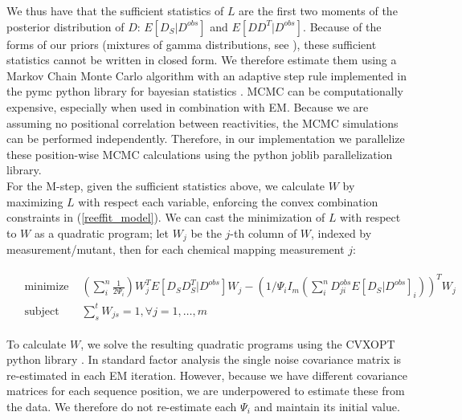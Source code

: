 \documentclass[12pt]{article}
\begin{document}
We thus have that the sufficient statistics of $L$ are the first two moments of the posterior distribution of $D$: $E[D_S | D^{obs}]$ and $E[DD^T | D^{obs}]$. Because of the forms of our priors (mixtures of gamma distributions, see \cite{Cordero2012a}), these sufficient statistics cannot be written in closed form. We therefore estimate them using a Markov Chain Monte Carlo algorithm with an adaptive step rule implemented in the pymc python library for bayesian statistics \cite{Patil2010}. MCMC can be computationally expensive, especially when used in combination with EM. Because we are assuming no positional correlation between reactivities, the MCMC simulations can be performed independently. Therefore, in our implementation we parallelize these position-wise MCMC calculations using the python joblib parallelization library.\\
For the M-step, given the sufficient statistics above, we calculate $W$ by maximizing $L$ with respect each variable, enforcing the convex combination constraints in (\ref{reeffit_model}). We can cast the minimization of $L$ with respect to $W$ as a quadratic program;	 let $W_j$ be the $j$-th column of $W$, indexed by measurement/mutant, then for each chemical mapping measurement $j$:


\begin{align}
  &\begin{aligned}\label{W_qp}
   \mbox{minimize } &(\sum_i^n \frac{1}{2\Psi_{i}})W_j^TE[D_SD_S^T | D^{obs}]W_j - (1/\Psi_{i}I_{m}(\sum_i^n D^{obs}_{ji}E[D_S | D^{obs}]_i))^TW_j\\
   \mbox{subject to } & \sum_{s}^{t} W_{js} = 1, \forall j = 1, …, m
   \end{aligned}
\end{align}
 
To calculate $W$, we solve the resulting quadratic programs using the CVXOPT python library \cite{Dahl2006}. In standard factor analysis the single noise covariance matrix is re-estimated in each EM iteration. However, because we have different covariance matrices for each sequence position, we are underpowered to estimate these from the data. We therefore do not re-estimate each $\Psi_{i}$ and maintain its initial value.

\end{document}

